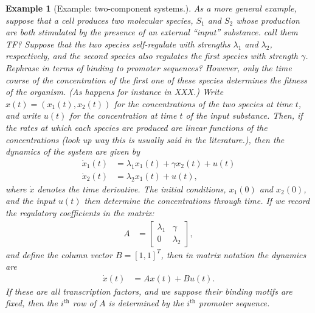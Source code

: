 \documentclass[11 pt]{article}
\newcommand{\plr}[1]{{\color{blue}\it #1}}
\newcommand{\ddt}{\dot}
\newtheorem{example}{Example}
\begin{document}
\begin{example}[Example: two-component systems.] \label{ex:2x2}
As a more general example,
suppose that a cell produces two molecular species, $S_1$ and $S_2$ 
whose production are both stimulated by the presence of an external ``input'' substance.
\plr{call them TF?}
Suppose that the two species self-regulate with strengths $\lambda_1$ and $\lambda_2$, respectively,
and the second species also regulates the first species with strength $\gamma$.
\plr{Rephrase in terms of binding to promoter sequences?}
However, only the time course of the concentration of
the first one of these species determines the fitness of the organism.
(As happens for instance in \plr{XXX}.)
Write $x(t) = (x_1(t),x_2(t))$ for the concentrations of the two species at time $t$,
and write $u(t)$ for the concentration at time $t$ of the input substance.
Then, if the rates at which each species are produced
are linear functions of the concentrations
\plr{(look up way this is usually said in the literature.)},
then the dynamics of the system are given by
\begin{align*}
    \ddt x_1(t) &= \lambda_1 x_1(t) + \gamma x_2(t) + u(t) \\
    \ddt x_2(t) &= \lambda_2 x_1(t) + u(t) ,
\end{align*}
where $\ddt x$ denotes the time derivative.
The initial conditions, $x_1(0)$ and $x_2(0)$, 
and the input $u(t)$ then determine the concentrations through time.
If we record the regulatory coefficients in the matrix:
\begin{align*}
    A &= \left[\begin{matrix} 
        \lambda_1 & \gamma \\ 
       0 & \lambda_2  
    \end{matrix}\right],
\end{align*}
and define the column vector $B = [1,1]^T$,
then in matrix notation the dynamics are
\begin{align*}
    \ddt x(t) &= A x(t) + B u(t) .
\end{align*}
If these are all transcription factors,
and we suppose their binding motifs are fixed,
then the $i^\text{th}$ row of $A$ is determined by the $i^\text{th}$ promoter sequence.

\end{example}
\end{document}
